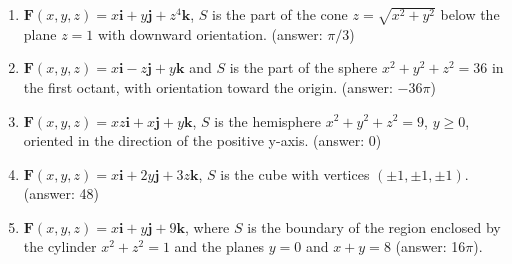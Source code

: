 \documentclass[10pt,letter]{article}
\newcommand{\F}{\mathbf{F}}
\renewcommand{\i}{\mathbf{i}}
\renewcommand{\j}{\mathbf{j}}
\renewcommand{\k}{\mathbf{k}}
\begin{document}
\begin{enumerate}
\item $\F(x,y,z)=x\i+y\j+z^4\k$, $S$ is the part of the cone $z=\sqrt{x^2+y^2}$ below the plane $z=1$ with downward orientation. (answer: $\pi/3$)
\item $\F(x,y,z)= x\i-z\j+y\k$ and $S$ is the part of the sphere $x^2+y^2+z^2=36$ in the first octant, with orientation toward the origin. (answer: $-36\pi$)
\item $\F(x,y,z)= xz\i+x\j+y\k$, $S$ is the hemisphere $x^2+y^2+z^2=9$, $y\geq 0$, oriented in the direction of the positive y-axis. (answer: 0)
\item $\F(x,y,z)= x\i+2y\j+3z\k$, $S$ is the cube with vertices $(\pm 1, \pm1,\pm1)$. (answer: 48)
\item $\F(x,y,z)= x\i+y\j+9\k$, where $S$ is the boundary of the region enclosed by the cylinder $x^2+z^2=1$ and the planes $y=0$ and $x+y=8$ (answer: 16$\pi$).
\end{enumerate}
\end{document}

